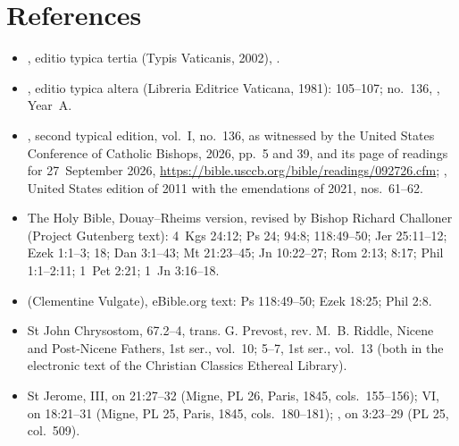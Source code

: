 \section*{References}

{\footnotesize\setlength{\baselineskip}{10.5pt}
\begin{itemize}\setlength{\itemsep}{0pt}\setlength{\parskip}{0pt}
\item {}, editio typica tertia (Typis Vaticanis, 2002), .
\item {}, editio typica altera (Libreria Editrice Vaticana, 1981):  105--107; no.~136, , Year~A.
\item {}, second typical edition, vol.~I, no.~136, as witnessed by the United States Conference of Catholic Bishops,  2026, pp.~5 and 39, and its page of readings for 27~September 2026, \url{https://bible.usccb.org/bible/readings/092726.cfm}; , United States edition of 2011 with the emendations of 2021, nos.~61--62.
\item The Holy Bible, Douay--Rheims version, revised by Bishop Richard Challoner (Project Gutenberg text): 4~Kgs 24:12; Ps 24; 94:8; 118:49--50; Jer 25:11--12; Ezek 1:1--3; 18; Dan 3:1--43; Mt 21:23--45; Jn 10:22--27; Rom 2:13; 8:17; Phil 1:1--2:11; 1~Pet 2:21; 1~Jn 3:16--18.
\item {} (Clementine Vulgate), eBible.org text: Ps 118:49--50; Ezek 18:25; Phil 2:8.
\item St John Chrysostom,  67.2--4, trans. G. Prevost, rev. M.~B. Riddle, Nicene and Post-Nicene Fathers, 1st ser., vol.~10;  5--7, 1st ser., vol.~13 (both in the electronic text of the Christian Classics Ethereal Library).
\item St Jerome,  III, on 21:27--32 (Migne, PL 26, Paris, 1845, cols.~155--156);  VI, on 18:21--31 (Migne, PL 25, Paris, 1845, cols.~180--181); , on 3:23--29 (PL 25, col.~509).

\end{itemize}}

